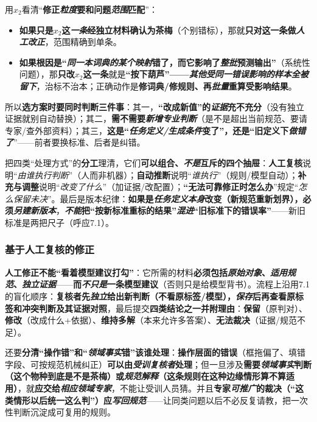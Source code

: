 用$x_2$看清“\textbf{修正\emph{粒度}要和问题\emph{范围}匹配}”：
\begin{itemize}\item \textbf{如果只是$x_2$这\emph{一条}经独立材料确认为茶梅}（个别错标），那就\textbf{只对这一条做\emph{人工改正}}，范围精确到单条。\item \textbf{如果根因是“\emph{同一本词典的某个映射}错了，而它影响了\emph{整批}预测输出”}（系统性问题），那\textbf{只改$x_2$这一条}就是\textbf{“按下葫芦”——\emph{其他受同一错误影响的样本全被留下}}，治标不治本；正确动作是\textbf{修词典/修规则、再\emph{批量}重算受影响结果}。\end{itemize}
所以\textbf{选方案时要同时判断三件事}：其一，\textbf{“改成新值”的\emph{证据}充不充分}（没有独立证据就别自动替换）；其二，\textbf{需不需要\emph{新增专业判断}}（是不是超出当前规范、要请专家/查外部资料）；其三，\textbf{这是“\emph{任务定义/生成条件}变了”，还是“旧定义下\emph{做错了}}”——前者要换标准、后者是纠错。

把四类“处理方式”的\textbf{分工}理清，它们\textbf{可以组合、\emph{不是}互斥的四个抽屉}：\textbf{人工复核}说明“\emph{由谁执行判断}”（人而非机器）；\textbf{自动推断}说明“\emph{谁执行}”（规则/模型自动）；\textbf{补充与调整}说明“\emph{改变了什么}”（加证据/改配置）；\textbf{“无法可靠修正时怎么办}”规定“\emph{怎么保留未决}”。最后是版本纪律：\textbf{如果是\emph{任务定义本身}改变（新规范重新划界），必须\emph{另建新版本}}，\textbf{\emph{不能}把“按新标准重标的结果”\emph{混进}“旧标准下的错误率”}——新旧标准是两把尺子（呼应7.1）。

\subsubsection{基于人工复核的修正}
\label{sec:knowledge-quality-assessment-correction-human-repair}

\textbf{人工修正不能“看着模型建议打勾”}：它所需的材料\textbf{必须包括\emph{原始对象}、\emph{适用规范}、\emph{独立证据}}——\textbf{而\emph{不只是}一条模型建议}（否则只是给模型背书）。流程上沿用7.1的盲化顺序：\textbf{复核者先\emph{独立}给出新判断（不看原标签/模型），\emph{保存}后再查看原标签和冲突判断及其证据对照}，最后提交\textbf{四类结论之一并附理由}：\textbf{保留}（原判对）、\textbf{修改}（改成什么+依据）、\textbf{维持多解}（本来允许多答案）、\textbf{无法裁决}（证据/规范不足）。

还要\textbf{分清“操作错”和“\emph{领域事实}错”该谁处理}：\textbf{操作层面的错误}（框拖偏了、填错字段、可按规范机械纠正）\textbf{可以由\emph{受训复核者}处理}；但一旦涉及\textbf{需要\emph{领域事实}判断（这个物种到底是不是茶梅）或\emph{规范解释}（这条规则在这种边缘情形算不算适用）}，就\textbf{应交给\emph{相应领域专家}}，不能让受训人员猜。并且\textbf{专家\emph{可推广}的裁决（“这类情形以后统一这么判”）应\emph{写回规范}}——让同类问题以后不必反复请教，把一次性判断沉淀成可复用的规则。

